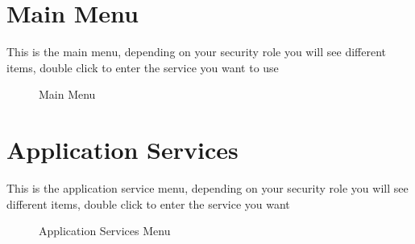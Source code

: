 \documentclass[12pt]{article}
\begin{document}
 \newpage
\section{Main Menu}
This is the main menu, depending on your security role you will see different items, double click to enter the service you want to use
\begin{figure}[H]
\centering	
{}
\caption{Main Menu}
\end{figure}

 \newpage
\section{Application Services}

This is the application service menu, depending on your security role you will see different items, double click to enter the service you want
\begin{figure}[H]
\centering	
{}
\caption{Application Services Menu}
\end{figure}
\end{document}
